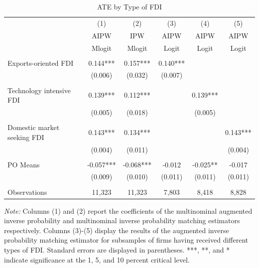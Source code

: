 \documentclass[a4paper,11pt]{scrartcl}
\begin{document}
\begin{table}[h!]
	\centering
	\caption{ATE by Type of FDI}
	\label{tab:bytype}
\begin{threeparttable}

\begin{tabular}{lccccc} 
		\hline
		\hline
 	& (1) & (2) & (3) & (4) & (5) \\
	& AIPW & IPW  & AIPW  & AIPW & AIPW \\ 
	& Mlogit & Mlogit &Logit &Logit &Logit\\
		\hline
 			&  &  &  &  &   \\
Exports-oriented FDI 	& 0.144*** &   0.157*** & 0.140*** &  &  \\
 						& (0.006) &   (0.032) & (0.007) &  &\\ \\[-1.8ex]
Technology intensive FDI & 0.139***   & 0.112*** &  & 0.139*** &   \\
 						 & (0.005)  & (0.018) &  &  (0.005)&  \\ \\[-1.8ex]
Domestic market seeking FDI & 0.143*** &   0.134*** &  &  &0.143*** \\
 							& (0.004)   & (0.011) &  &  & (0.004)  \\ \\[-1.8ex]
PO Means 		&   -0.057*** &   -0.068*** &-0.012  &-0.025**  & -0.017    \\
 				&   (0.009) &   (0.010) &  (0.011)&(0.011)  & (0.011) \\ \\[-0.2em]
Observations 	& 11,323  & 11,323 &  7,803  & 8,418 & 8,828  \\ 
		\hline
		\hline
\end{tabular}

\begin{tablenotes} [flushleft]
\footnotesize
\item \textit{Note:} Columns (1) and (2) report the coefficients of the multinominal augmented inverse probability and multinominal inverse probability matching estimators respectively. Columns (3)-(5) display the results of the augmented inverse probability matching estimator for subsamples of firms having received different types of FDI. Standard errors are displayed in parentheses. ***, **, and * indicate significance at the 1, 5, and 10 percent critical level. 
\end{tablenotes}

\end{threeparttable}
\end{table}
\FloatBarrier
\end{document}
